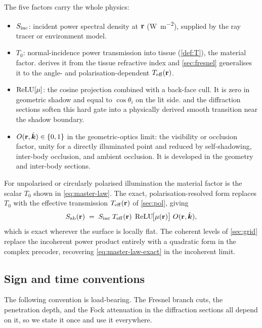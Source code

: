 The five factors carry the whole physics:
\begin{itemize}[leftmargin=1.4em,itemsep=1pt]
  \item $S_{\mathrm{inc}}$: incident power spectral density at $\mathbf{r}$
    (\si{\watt\per\square\metre}), supplied by the ray tracer or environment
    model.
  \item $T_0$: normal-incidence power transmission into tissue
    (\cref{def:T}), the material factor.  derives it from the
    tissue refractive index and \cref{sec:fresnel} generalises it to the
    angle- and polarisation-dependent $T_{\mathrm{eff}}(\mathbf{r})$.
  \item $\operatorname{ReLU}[\mu]$: the cosine projection combined with a back-face cull. It
    is zero in geometric shadow and equal to $\cos\theta_i$ on the lit side.
     and the diffraction sections soften this hard gate into a
    physically derived smooth transition near the shadow boundary.
  \item $O(\mathbf{r},\hat{\bm{k}})\in\{0,1\}$ in the geometric-optics limit: the visibility or occlusion factor, unity for a
    directly illuminated point and reduced by self-shadowing, inter-body
    occlusion, and ambient occlusion. It is developed in the geometry and
    inter-body sections.
\end{itemize}

For unpolarised or circularly polarised illumination the material factor is the
scalar $T_0$ shown in \cref{eq:master-law}. The exact, polarisation-resolved
form replaces $T_0$ with the effective transmission $T_{\mathrm{eff}}(\mathbf{r})$ of
\cref{sec:pol}, giving
\begin{equation}\label{eq:master-law-exact}
  S_{\mathrm{ab}}(\mathbf{r}) \;=\; S_{\mathrm{inc}}\;T_{\mathrm{eff}}(\mathbf{r})\;\operatorname{ReLU}\!\bigl[\mu(\mathbf{r})\bigr]\;O(\mathbf{r},\hat{\bm{k}}),
\end{equation}
which is exact wherever the surface is locally flat. The coherent levels of
\cref{sec:grid} replace the incoherent power product entirely with a
quadratic form in the complex precoder, recovering \cref{eq:master-law-exact}
in the incoherent limit.

\subsection{Sign and time conventions}\label{sec:conventions}

The following convention is load-bearing. The Fresnel branch cuts, the
penetration depth, and the Fock attenuation in the diffraction sections all
depend on it, so we state it once and use it everywhere.

